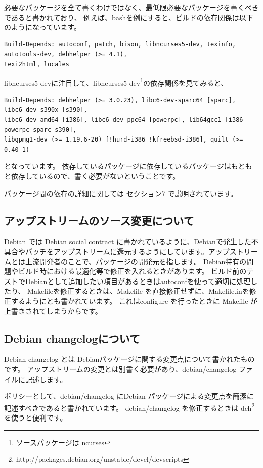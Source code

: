 \documentclass[mingoth,a4paper]{jsarticle}
\begin{document}
必要なパッケージを全て書くわけではなく、最低限必要なパッケージを書くべきであると書かれており、
例えば、bashを例にすると、ビルドの依存関係は以下のようになっています。

\begin{verbatim} 
Build-Depends: autoconf, patch, bison, libncurses5-dev, texinfo, autotools-dev, debhelper (>= 4.1), 
texi2html, locales
\end{verbatim}

libncurses5-devに注目して、libncurses5-dev\footnote{ソースパッケージは ncurses }の依存関係を見てみると、
\begin{verbatim}
Build-Depends: debhelper (>= 3.0.23), libc6-dev-sparc64 [sparc], libc6-dev-s390x [s390], 
libc6-dev-amd64 [i386], libc6-dev-ppc64 [powerpc], lib64gcc1 [i386 powerpc sparc s390], 
libgpmg1-dev (>= 1.19.6-20) [!hurd-i386 !kfreebsd-i386], quilt (>= 0.40-1)
\end{verbatim}
となっています。
依存しているパッケージに依存しているパッケージはもともと依存しているので、書く必要がないということです。

パッケージ間の依存の詳細に関しては セクション7 で説明されています。

\subsection{アップストリームのソース変更について}
Debian では Debian social contract に書かれているように、Debianで発生した不具合やパッチをアップストリームに還元するようにしています。アップストリームとは上流開発者のことで、パッケージの開発元を指します。
Debian特有の問題やビルド時における最適化等で修正を入れるときがあります。
ビルド前のテストでDebianとして追加したい項目があるときはautoconfを使って適切に処理したり、
Makefileを修正するときは、Makefile を直接修正せずに、Makefile.inを修正するようにとも書かれています。
これはconfigure を行ったときに Makefile が上書きされてしまうからです。

\subsection{Debian changelogについて}
Debian changelog とは Debianパッケージに関する変更点について書かれたものです。
アップストリームの変更とは別書く必要があり、debian/changelog ファイルに記述します。

ポリシーとして、debian/changelog にDebian パッケージによる変更点を簡潔に記述すべきであると書かれています。
debian/changelog を修正するときは dch\footnote{http://packages.debian.org/unstable/devel/devscripts}を使うと便利です。
\end{document}
